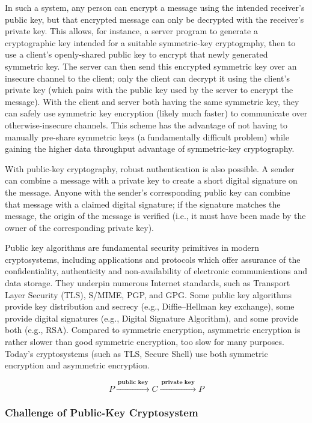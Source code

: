 \documentclass[british]{article}
\begin{document}
In such a system, any person can encrypt a message using the intended
receiver's public key, but that encrypted message can only be decrypted
with the receiver's private key. This allows, for instance, a server
program to generate a cryptographic key intended for a suitable symmetric-key
cryptography, then to use a client's openly-shared public key to encrypt
that newly generated symmetric key. The server can then send this
encrypted symmetric key over an insecure channel to the client; only
the client can decrypt it using the client's private key (which pairs
with the public key used by the server to encrypt the message). With
the client and server both having the same symmetric key, they can
safely use symmetric key encryption (likely much faster) to communicate
over otherwise-insecure channels. This scheme has the advantage of
not having to manually pre-share symmetric keys (a fundamentally difficult
problem) while gaining the higher data throughput advantage of symmetric-key
cryptography.

With public-key cryptography, robust authentication is also possible.
A sender can combine a message with a private key to create a short
digital signature on the message. Anyone with the sender's corresponding
public key can combine that message with a claimed digital signature;
if the signature matches the message, the origin of the message is
verified (i.e., it must have been made by the owner of the corresponding
private key).

Public key algorithms are fundamental security primitives in modern
cryptosystems, including applications and protocols which offer assurance
of the confidentiality, authenticity and non-availability of electronic
communications and data storage. They underpin numerous Internet standards,
such as Transport Layer Security (TLS), S/MIME, PGP, and GPG. Some
public key algorithms provide key distribution and secrecy (e.g.,
Diffie--Hellman key exchange), some provide digital signatures (e.g.,
Digital Signature Algorithm), and some provide both (e.g., RSA). Compared
to symmetric encryption, asymmetric encryption is rather slower than
good symmetric encryption, too slow for many purposes. Today's cryptosystems
(such as TLS, Secure Shell) use both symmetric encryption and asymmetric
encryption.

$$ P\xrightarrow{\:\textbf{public key}\:}C\xrightarrow{\:\textbf{private key}\:}P $$

\medskip{}


\subsubsection{Challenge of Public-Key Cryptosystem }
\end{document}

